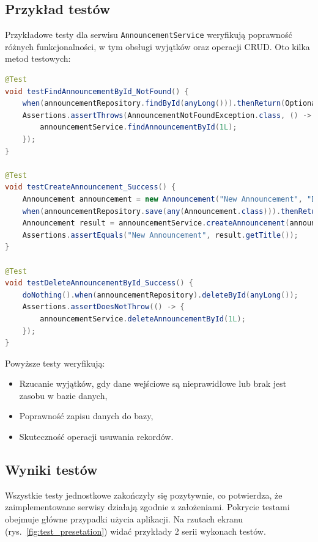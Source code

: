 \subsection{Przykład testów}
Przykładowe testy dla serwisu \texttt{AnnouncementService} weryfikują poprawność różnych funkcjonalności, w tym obsługi wyjątków oraz operacji CRUD. Oto kilka metod testowych:

\begin{lstlisting}[language=Java, caption= Przykłądowe testy dla \texttt{AnnouncementService}]
@Test
void testFindAnnouncementById_NotFound() {
    when(announcementRepository.findById(anyLong())).thenReturn(Optional.empty());
    Assertions.assertThrows(AnnouncementNotFoundException.class, () -> {
        announcementService.findAnnouncementById(1L);
    });
}

@Test
void testCreateAnnouncement_Success() {
    Announcement announcement = new Announcement("New Announcement", "Description");
    when(announcementRepository.save(any(Announcement.class))).thenReturn(announcement);
    Announcement result = announcementService.createAnnouncement(announcement);
    Assertions.assertEquals("New Announcement", result.getTitle());
}

@Test
void testDeleteAnnouncementById_Success() {
    doNothing().when(announcementRepository).deleteById(anyLong());
    Assertions.assertDoesNotThrow(() -> {
        announcementService.deleteAnnouncementById(1L);
    });
}
\end{lstlisting}

Powyższe testy weryfikują: 
\begin{itemize}
    \item Rzucanie wyjątków, gdy dane wejściowe są nieprawidłowe lub brak jest zasobu w bazie danych,
    \item Poprawność zapisu danych do bazy,
    \item Skuteczność operacji usuwania rekordów.
\end{itemize}

\subsection{Wyniki testów}
Wszystkie testy jednostkowe zakończyły się pozytywnie, co potwierdza, że zaimplementowane serwisy działają zgodnie z założeniami. Pokrycie testami obejmuje główne przypadki użycia aplikacji. Na rzutach ekranu (rys.~\ref{fig:test_presetation}) widać przykłady 2 serii wykonach testów.

